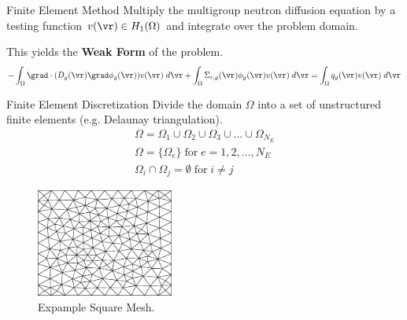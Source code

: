\begin{frame}{Finite Element Method}
  Multiply the multigroup neutron diffusion equation by a testing function
  $v(\vr) \in H_1(\Omega)$ and integrate over the problem domain. 
  
  This yields the \textbf{Weak Form} of the problem.
  \begin{equation}
    \label{eq:fem_weak_form}
    - \int_{\Omega} \grad \cdot (D_g(\vr) \grad \phi_g(\vr)) v(\vr) \; d\vr
      + \int_{\Omega} \Sigma_{r,g}(\vr) \phi_g(\vr) v(\vr) \;d\vr=
      \int_{\Omega} q_g(\vr) v(\vr) \;d\vr
  \end{equation}
\end{frame}

\begin{frame}{Finite Element Discretization}
  Divide the domain $\Omega$ into a set of unstructured finite elements 
  (e.g. Delaunay triangulation).
  \begin{gather}
    \label{eq:set_of_elements}
    \Omega = \Omega_1 \cup \Omega_2 \cup \Omega_3 \cup \ldots \cup
      \Omega_{N_E}  \\
    \Omega = \{\Omega_e\} \; \text{for} \; e = 1,2,\ldots,N_E \\
    \Omega_i \cap \Omega_j = \emptyset \; \text{for} \; i \ne j
  \end{gather}
  \begin{figure}
    \centering
    \includegraphics[width=0.4\textwidth]{./figs/fixed0}
    \caption{Expample Square Mesh.}
    \label{fig:fixed0}
  \end{figure}
\end{frame}

